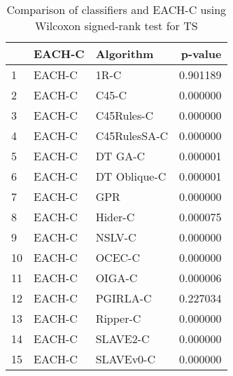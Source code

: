 \begin{table}
\footnotesize
\caption{Comparison of classifiers and EACH-C using Wilcoxon signed-rank test for TS}
\label{tab:EACH-C wilcoxon TS comparison}
\begin{tabular}{lllr}
\hline
 & EACH-C & Algorithm & p-value \\
\hline
1 & EACH-C & 1R-C & 0.901189 \\
2 & EACH-C & C45-C & 0.000000 \\
3 & EACH-C & C45Rules-C & 0.000000 \\
4 & EACH-C & C45RulesSA-C & 0.000000 \\
5 & EACH-C & DT GA-C & 0.000001 \\
6 & EACH-C & DT Oblique-C & 0.000001 \\
7 & EACH-C & GPR & 0.000000 \\
8 & EACH-C & Hider-C & 0.000075 \\
9 & EACH-C & NSLV-C & 0.000000 \\
10 & EACH-C & OCEC-C & 0.000000 \\
11 & EACH-C & OIGA-C & 0.000006 \\
12 & EACH-C & PGIRLA-C & 0.227034 \\
13 & EACH-C & Ripper-C & 0.000000 \\
14 & EACH-C & SLAVE2-C & 0.000000 \\
15 & EACH-C & SLAVEv0-C & 0.000000 \\
\hline
\end{tabular}
\end{table}
